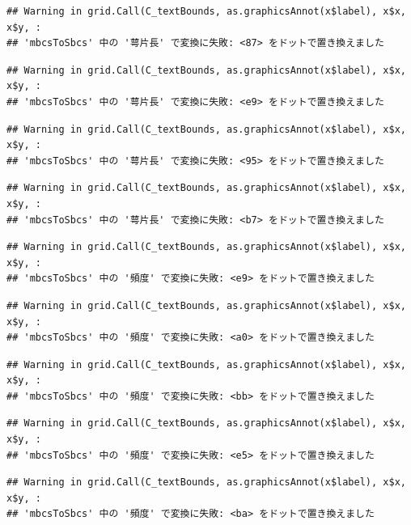 \documentclass[
]{book}
\begin{document}
\begin{verbatim}
## Warning in grid.Call(C_textBounds, as.graphicsAnnot(x$label), x$x, x$y, :
## 'mbcsToSbcs' 中の '萼片長' で変換に失敗: <87> をドットで置き換えました
\end{verbatim}

\begin{verbatim}
## Warning in grid.Call(C_textBounds, as.graphicsAnnot(x$label), x$x, x$y, :
## 'mbcsToSbcs' 中の '萼片長' で変換に失敗: <e9> をドットで置き換えました
\end{verbatim}

\begin{verbatim}
## Warning in grid.Call(C_textBounds, as.graphicsAnnot(x$label), x$x, x$y, :
## 'mbcsToSbcs' 中の '萼片長' で変換に失敗: <95> をドットで置き換えました
\end{verbatim}

\begin{verbatim}
## Warning in grid.Call(C_textBounds, as.graphicsAnnot(x$label), x$x, x$y, :
## 'mbcsToSbcs' 中の '萼片長' で変換に失敗: <b7> をドットで置き換えました
\end{verbatim}

\begin{verbatim}
## Warning in grid.Call(C_textBounds, as.graphicsAnnot(x$label), x$x, x$y, :
## 'mbcsToSbcs' 中の '頻度' で変換に失敗: <e9> をドットで置き換えました
\end{verbatim}

\begin{verbatim}
## Warning in grid.Call(C_textBounds, as.graphicsAnnot(x$label), x$x, x$y, :
## 'mbcsToSbcs' 中の '頻度' で変換に失敗: <a0> をドットで置き換えました
\end{verbatim}

\begin{verbatim}
## Warning in grid.Call(C_textBounds, as.graphicsAnnot(x$label), x$x, x$y, :
## 'mbcsToSbcs' 中の '頻度' で変換に失敗: <bb> をドットで置き換えました
\end{verbatim}

\begin{verbatim}
## Warning in grid.Call(C_textBounds, as.graphicsAnnot(x$label), x$x, x$y, :
## 'mbcsToSbcs' 中の '頻度' で変換に失敗: <e5> をドットで置き換えました
\end{verbatim}

\begin{verbatim}
## Warning in grid.Call(C_textBounds, as.graphicsAnnot(x$label), x$x, x$y, :
## 'mbcsToSbcs' 中の '頻度' で変換に失敗: <ba> をドットで置き換えました
\end{verbatim}
\end{document}
